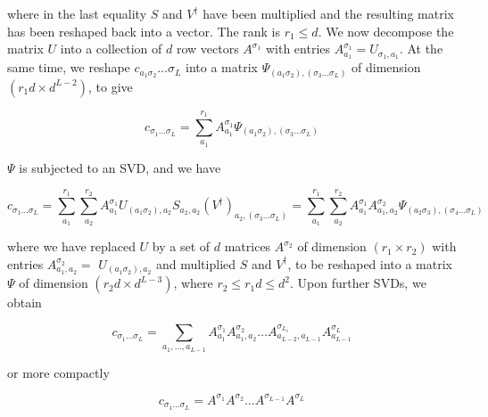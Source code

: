 \documentclass[12pt]{article}
\begin{document}
where in the last equality $S$ and $V^{\dagger}$ have been multiplied and the resulting matrix has been reshaped back into a vector. The rank is $r_{1} \leq d$. We now decompose the matrix $U$ into a collection of $d$ row vectors $A^{\sigma_{1}}$ with entries $A_{a_{1}}^{\sigma_{1}}=U_{\sigma_{1}, a_{1}}$. At the same time, we reshape $c_{a_{1} \sigma_{2}} \ldots \sigma_{L}$ into a matrix $\Psi_{\left(a_{1} \sigma_{2}\right),\left(\sigma_{3} \ldots \sigma_{L}\right)}$ of dimension $\left(r_{1} d \times d^{L-2}\right)$, to give


\begin{equation*}
c_{\sigma_{1} \ldots \sigma_{L}}=\sum_{a_{1}}^{r_{1}} A_{a_{1}}^{\sigma_{1}} \Psi_{\left(a_{1} \sigma_{2}\right),\left(\sigma_{3} \ldots \sigma_{L}\right)} \tag{33}
\end{equation*}


$\Psi$ is subjected to an SVD, and we have


\begin{equation*}
c_{\sigma_{1} \ldots \sigma_{L}}=\sum_{a_{1}}^{r_{1}} \sum_{a_{2}}^{r_{2}} A_{a_{1}}^{\sigma_{1}} U_{\left(a_{1} \sigma_{2}\right), a_{2}} S_{a_{2}, a_{2}}\left(V^{\dagger}\right)_{a_{2},\left(\sigma_{3} \ldots \sigma_{L}\right)}=\sum_{a_{1}}^{r_{1}} \sum_{a_{2}}^{r_{2}} A_{a_{1}}^{\sigma_{1}} A_{a_{1}, a_{2}}^{\sigma_{2}} \Psi_{\left(a_{2} \sigma_{3}\right),\left(\sigma_{4} \ldots \sigma_{L}\right)} \tag{34}
\end{equation*}


where we have replaced $U$ by a set of $d$ matrices $A^{\sigma_{2}}$ of dimension $\left(r_{1} \times r_{2}\right)$ with entries $A_{a_{1}, a_{2}}^{\sigma_{2}}=$ $U_{\left(a_{1} \sigma_{2}\right), a_{2}}$ and multiplied $S$ and $V^{\dagger}$, to be reshaped into a matrix $\Psi$ of dimension $\left(r_{2} d \times d^{L-3}\right)$, where $r_{2} \leq r_{1} d \leq d^{2}$. Upon further SVDs, we obtain


\begin{equation*}
c_{\sigma_{1} \ldots \sigma_{L}}=\sum_{a_{1}, \ldots, a_{L-1}} A_{a_{1}}^{\sigma_{1}} A_{a_{1}, a_{2}}^{\sigma_{2}} \ldots A_{a_{L-2}, a_{L-1}}^{\sigma_{L_{1}}} A_{a_{L-1}}^{\sigma_{L}} \tag{35}
\end{equation*}


or more compactly


\begin{equation*}
c_{\sigma_{1} \ldots \sigma_{L}}=A^{\sigma_{1}} A^{\sigma_{2}} \ldots A^{\sigma_{L-1}} A^{\sigma_{L}} \tag{36}
\end{equation*}
\end{document}
